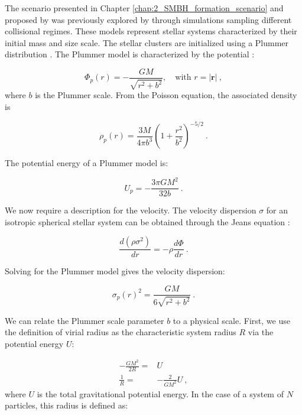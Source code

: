 The scenario presented in Chapter \ref{chap:2_SMBH_formation_scenario} and proposed by \citet{escala2021observational} was previously explored by \citet{vergara2023global} through simulations sampling different collisional regimes. These models represent stellar systems characterized by their initial mass and size scale. The stellar clusters are initialized using a Plummer distribution \citep{plummer1911problem}. The Plummer model is characterized by the potential \citep{2008gady.book.....B}:

\begin{equation}
	\Phi_p(r) = -\frac{GM}{\sqrt{r^2 + b^2}},\quad \text{with } r = |\mathbf{r}|~,
\end{equation}
where $b$ is the Plummer scale. From the Poisson equation, the associated density is

\begin{equation}
	\rho_p(r) = \frac{3M}{4\pi b^3} \left(1+\frac{r^2}{b^2}\right)^{-5/2}~.
\end{equation}

The potential energy of a Plummer model is:

\begin{equation}
	U_p = - \frac{3 \pi G M^2}{32b}~.
	\label{eq:4.3_Upl}
\end{equation}

We now require a description for the velocity. The velocity dispersion $\sigma$ for an isotropic spherical stellar system can be obtained through the Jeans equation \citep{2008gady.book.....B}:

\begin{equation}
	\frac{d(\rho \sigma^2)}{d r} = -\rho \frac{d \Phi}{d r}~.
\end{equation}

Solving for the Plummer model gives the velocity dispersion:

\begin{equation}
	\sigma_p(r)^2 = \frac{GM}{6\sqrt{r^2 + b^2}}~.
\end{equation}

We can relate the Plummer scale parameter $b$ to a physical scale. First, we use the definition of virial radius as the characteristic system radius $R$ via the potential energy $U$:

\begin{align}
	-\frac{GM^2}{2R} =& U \\
	\frac{1}{R} =& -\frac{2}{GM^2}U~,
	\label{eq:4.7_virial_radius}
\end{align}
where $U$ is the total gravitational potential energy. In the case of a system of $N$ particles, this radius is defined as:

